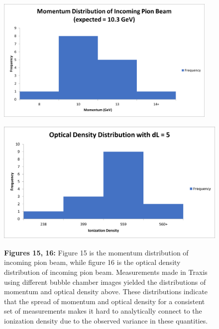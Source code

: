 \documentclass[12pt]{article} %
\begin{document}
\begin{figure}
\centering
\begin{minipage}{.5\textwidth}
  \centering
  \includegraphics[width=\linewidth, height = 6cm]{momentum_distribution.png}
  \label{fig:momentum_distribution}
\end{minipage}%
\begin{minipage}{.5\textwidth}
  \centering
  \includegraphics[width=\linewidth, height = 6cm]{ionization_distribution.png}
  \label{fig:ionization_distribution}
\end{minipage}
\caption*{\textbf{Figures 15, 16:} Figure 15 is the momentum distribution of incoming pion beam, while figure 16 is the optical density distribution of incoming pion beam. Measurements made in Traxis using different bubble chamber images yielded the distributions of momentum and optical density above. These distributions indicate that the spread of momentum and optical density for a consistent set of measurements makes it hard to analytically connect to the ionization density due to the observed variance in these quantities.}
\label{fig:Parameter_Distributions}
\end{figure}
\end{document}
